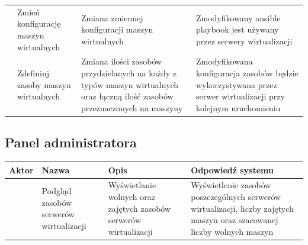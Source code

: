 \documentclass[12pt]{article}
\begin{document}
\begin{center}
\begin{table}[h!]
\begin{tabular}{|p{}|p{}|p{}|p{}|}
			                                                & Zmień konfigurację maszyn wirtualnych & Zmiana zmiennej konfiguracji maszyn wirtualnych                                                                              & Zmodyfikowany ansible playbook jest używany przez serwery wirtualizacji                                                          \\ \cline{2-4}
			                                                & Zdefiniuj zasoby maszyn wirtualnych   & Zmiana ilości zasobów przydzielanych na każdy z typów maszyn wirtualnych oraz łączną ilość zasobów przeznaczonych na maszyny & Zmodyfikowana konfiguracja zasobów będzie wykorzystywana przez serwer wirtualizacji przy kolejnym uruchomieniu                   \\
			\hline
		\end{tabular}
	\end{table}
\end{center}

\newpage

\subsection{Panel administratora}
\begin{center}
	\begin{table}[h!]
		\begin{tabular}{|p{}|p{}|p{}|p{}|}
			\hline Aktor                                                                    & Nazwa                                  & Opis                                                              & Odpowiedź systemu                                                                                                                                                    \\ \hline
			\multirow{7}{=}{\rotatebox{90}{Administrator}}                                  & Podgląd zasobów serwerów wirtualizacji & Wyświetlanie wolnych oraz zajętych zasobów serwerów wirtualizacji & Wyświetlenie zasobów poszczególnych serwerów wirtualizacji, liczby zajętych maszyn oraz szacowanej liczby wolnych maszyn \newline\newline                            \\
			\hline
		\end{tabular}
	\end{table}
\end{center}
\end{document}
